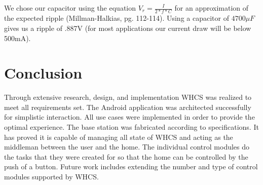 \documentclass[draft,twocolumn,letterpaper,10pt]{IEEEtran}
\begin{document}
We chose our capacitor using the equation $V_r = \frac{I}{2*f*C}$ for an approximation
of the expected ripple (Millman-Halkias, pg. 112-114). Using a capacitor of
$4700\mu F$ gives us a ripple of .887V (for most applications our current draw will
be below 500mA).

\section{Conclusion}
Through extensive research, design, and implementation WHCS was realized to
meet all requirements set. The Android application was architected successfully
for simplistic interaction. All use cases were implemented in order to provide
the optimal experience. The base station was fabricated according to
specifications. It has proved it is capable of managing all state of WHCS and
acting as the middleman between the user and the home. The individual control
modules do the tasks that they were created for so that the home can be
controlled by the push of a button. Future work includes extending the
number and type of control modules supported by WHCS.

%
%
%

\end{document}
